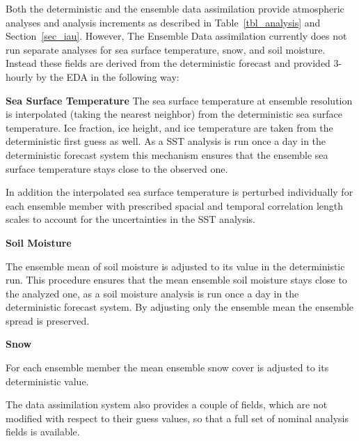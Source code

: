 Both the deterministic and the ensemble data assimilation provide
atmospheric analyses and analysis increments as described in
Table~\ref{tbl_analysis} and Section~\ref{sec_iau}. However, The
Ensemble Data assimilation currently does not run separate analyses
for sea surface temperature, snow, and soil moisture. Instead these
fields are derived from the deterministic forecast and provided
3-hourly by the EDA in the following way:

\begin{description}
\item{\bf Sea Surface Temperature} 
  The sea surface temperature at ensemble resolution is interpolated
  (taking the nearest neighbor) from the deterministic sea surface
  temperature. Ice fraction, ice height, and ice temperature are taken
  from the deterministic first guess as well. As a SST analysis is run
  once a day in the deterministic forecast system this mechanism
  ensures that the ensemble sea surface temperature stays close to the
  observed one.

  In addition the interpolated sea surface temperature is perturbed
  individually for each ensemble member with prescribed spacial and
  temporal correlation length scales to account for the uncertainties
  in the SST analysis.

\item{\bf Soil Moisture}

  The ensemble mean of soil moisture is adjusted to its value in the
  deterministic run. This procedure ensures that the mean ensemble
  soil moisture stays close to the analyzed one, as a soil moisture
  analysis is run once a day in the deterministic forecast system.  By
  adjusting only the ensemble mean the ensemble spread is preserved.
  
\item{\bf Snow}

  For each ensemble member the mean ensemble snow cover is adjusted
  to its deterministic value.

\end{description}

The data assimilation system also provides a couple of fields, which
are not modified with respect to their guess values, so that a full
set of nominal analysis fields is available. 

